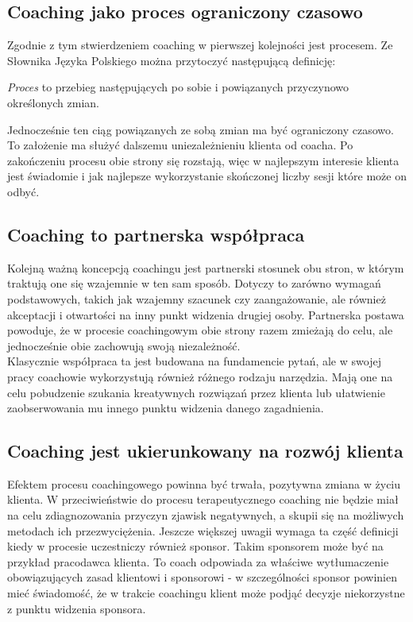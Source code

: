 \subsection{Coaching jako proces ograniczony czasowo}
Zgodnie z tym stwierdzeniem coaching w pierwszej kolejności jest procesem. Ze Słownika Języka Polskiego można przytoczyć następującą definicję:
\begin{defn}
\emph{Proces} to przebieg następujących po sobie i powiązanych przyczynowo określonych zmian.
\end{defn}
Jednocześnie ten ciąg powiązanych ze sobą zmian ma być ograniczony czasowo. To założenie ma służyć dalszemu uniezależnieniu klienta
od coacha. Po zakończeniu procesu obie strony się rozstają, więc w najlepszym interesie klienta jest świadomie i jak najlepsze wykorzystanie
skończonej liczby sesji które może on odbyć.

\subsection{Coaching to partnerska współpraca}
Kolejną ważną koncepcją coachingu jest partnerski stosunek obu stron, w którym traktują one się wzajemnie w ten sam sposób. Dotyczy to zarówno
wymagań podstawowych, takich jak wzajemny szacunek czy zaangażowanie, ale również akceptacji i otwartości na inny punkt widzenia drugiej
osoby. Partnerska postawa powoduje, że w procesie coachingowym obie strony razem zmieżają do celu, ale jednocześnie obie zachowują
swoją niezależność. \\

Klasycznie współpraca ta jest budowana na fundamencie pytań, ale w swojej pracy coachowie wykorzystują również różnego rodzaju
narzędzia. Mają one na celu pobudzenie szukania kreatywnych rozwiązań przez klienta lub ułatwienie zaobserwowania
mu innego punktu widzenia danego zagadnienia.

\subsection{Coaching jest ukierunkowany na rozwój klienta}
Efektem procesu coachingowego powinna być trwała, pozytywna zmiana w życiu klienta. W przeciwieństwie do procesu terapeutycznego coaching
nie będzie miał na celu zdiagnozowania przyczyn zjawisk negatywnych, a skupii się na możliwych metodach ich przezwyciężenia. Jeszcze większej
uwagii wymaga ta część definicji kiedy w procesie uczestniczy również sponsor. Takim sponsorem może być na przykład pracodawca klienta.
To coach odpowiada za właściwe wytłumaczenie obowiązujących zasad klientowi i sponsorowi - w szczególności sponsor powinien mieć świadomość,
że w trakcie coachingu klient może podjąć decyzje niekorzystne z punktu widzenia sponsora.

